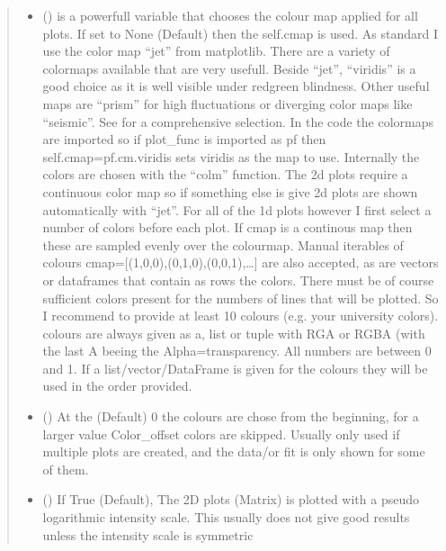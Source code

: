 \documentclass[letterpaper,10pt,english]{sphinxmanual}
\begin{document}
\begin{fulllineitems}
\begin{quote}
\begin{description}
\begin{itemize}
\item {} 
 (\sphinxstyleliteralemphasis{\sphinxupquote{, }}) \textendash{} is a powerfull variable that chooses the colour map applied for all plots. If set to
None (Default) then the self.cmap is used.
As standard I use the color map “jet” from matplotlib. There are a variety of colormaps
available that are very usefull. Beside “jet”, “viridis” is a good choice as it is well
visible under red\sphinxhyphen{}green blindness. Other useful maps are “prism” for high fluctuations
or diverging color maps like “seismic”.
See  for a comprehensive
selection. In the code the colormaps are imported so if plot\_func is imported as pf then
self.cmap=pf.cm.viridis sets viridis as the map to use. Internally the colors are chosen
with the “colm” function. The 2d plots require a continuous color map so if something
else is give 2d plots are shown automatically with “jet”. For all of the 1d plots however
I first select a number of colors before each plot. If cmap is a continous map then these
are sampled evenly over the colourmap. Manual iterables of colours
cmap={[}(1,0,0),(0,1,0),(0,0,1),…{]} are also accepted, as are vectors or dataframes that
contain as rows the colors. There must be of course sufficient colors present for
the numbers of lines that will be plotted. So I recommend to provide at least 10 colours
(e.g. your university colors). colours are always given as a, list or tuple with RGA or RGBA
(with the last A beeing the Alpha=transparency. All numbers are between 0 and 1.
If a list/vector/DataFrame is given for the colours they will be used in the order provided.

\item {} 
 (\sphinxstyleliteralemphasis{\sphinxupquote{, }}) \textendash{} At the (Default) 0 the colours are chose from the beginning, for a larger value Color\_offset
colors are skipped. Usually only used if multiple plots are created, and the data/or fit is
only shown for some of them.

\item {} 
 (\sphinxstyleliteralemphasis{\sphinxupquote{, }}) \textendash{} If True (Default), The 2D plots (Matrix) is plotted with a pseudo logarithmic intensity scale.
This usually does not give good results unless the intensity scale is symmetric


\end{itemize}
\end{description}
\end{quote}
\end{fulllineitems}
\end{document}
